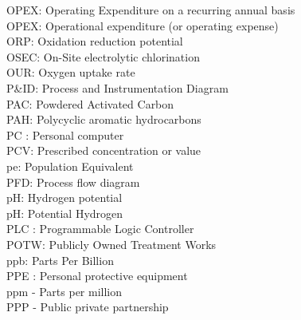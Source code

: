 OPEX:  Operating Expenditure on a recurring annual basis
\vspace{0.3cm}\\
OPEX:  Operational expenditure (or operating expense)
\vspace{0.3cm}\\
ORP:  Oxidation reduction potential
\vspace{0.3cm}\\
OSEC:  On-Site electrolytic chlorination
\vspace{0.3cm}\\
OUR:  Oxygen uptake rate
\vspace{0.3cm}\\
P\&ID: Process and Instrumentation Diagram
\vspace{0.3cm}\\
PAC:  Powdered Activated Carbon
\vspace{0.3cm}\\
PAH:  Polycyclic aromatic hydrocarbons
\vspace{0.3cm}\\
PC :  Personal computer
\vspace{0.3cm}\\
PCV:  Prescribed concentration or value
\vspace{0.3cm}\\
pe:  Population Equivalent
\vspace{0.3cm}\\
PFD:  Process flow diagram
\vspace{0.3cm}\\
pH:  Hydrogen potential
\vspace{0.3cm}\\
pH: Potential Hydrogen
\vspace{0.3cm}\\
PLC :  Programmable Logic Controller
\vspace{0.3cm}\\
POTW:  Publicly Owned Treatment Works
\vspace{0.3cm}\\
ppb: Parts Per Billion
\vspace{0.3cm}\\
PPE :  Personal protective equipment  
\vspace{0.3cm}\\
ppm - Parts per million
\vspace{0.3cm}\\
PPP - Public private partnership
\vspace{0.3cm}\\
